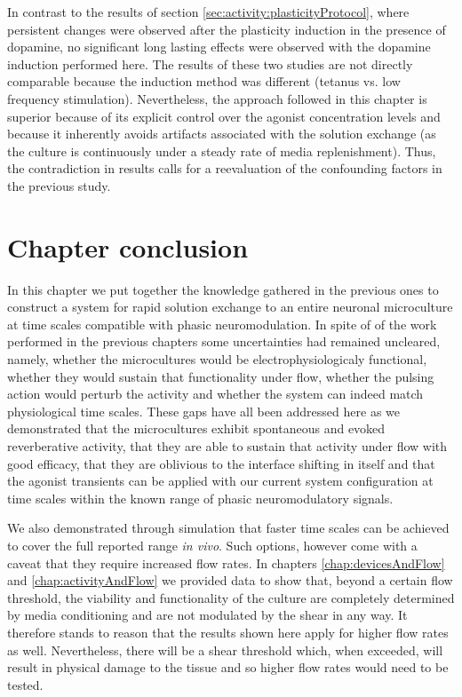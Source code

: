 In contrast to the results of section \ref{sec:activity:plasticityProtocol}, where persistent changes were observed after the plasticity induction in the presence of dopamine, no significant long lasting effects were observed with the dopamine induction performed here. The results of these two studies are not directly comparable because the induction method was different (tetanus vs. low frequency stimulation). Nevertheless, the approach followed in this chapter is superior because of its explicit control over the agonist concentration levels and because it inherently avoids artifacts associated with the solution exchange (as the culture is continuously under a steady rate of media replenishment). Thus, the contradiction in results calls for a reevaluation of the confounding factors in the previous study.

\section{Chapter conclusion}
In this chapter we put together the knowledge gathered in the previous ones to construct a system for rapid solution exchange to an entire neuronal microculture at time scales compatible with phasic neuromodulation. In spite of of the work performed in the previous chapters some uncertainties had remained uncleared, namely, whether the microcultures would be electrophysiologicaly functional, whether they would sustain that functionality under flow, whether the pulsing action would perturb the activity and whether the system can indeed match physiological time scales. These gaps have all been addressed here as we demonstrated that the microcultures exhibit spontaneous and evoked reverberative activity, that they are able to sustain that activity under flow with good efficacy, that they are oblivious to the interface shifting in itself and that the agonist transients can be applied with our current system configuration at time scales within the known range of phasic neuromodulatory signals.

We also demonstrated through simulation that faster time scales can be achieved to cover the full reported range \textit{in vivo}. Such options, however come with a caveat that they require increased flow rates. In chapters \ref{chap:devicesAndFlow} and \ref{chap:activityAndFlow} we provided data to show that, beyond a certain flow threshold, the viability and functionality of the culture are completely determined by media conditioning and are not modulated by the shear in any way. It therefore stands to reason that the results shown here apply for higher flow rates as well. Nevertheless, there will be a shear threshold which, when exceeded, will result in physical damage to the tissue and so higher flow rates would need to be tested.

